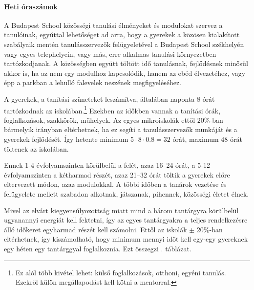 \paragraph{Heti óraszámok}

A Budapest School közösségi tanulási élményeket és modulokat szervez a
tanulóinak, egyúttal lehetőséget ad arra, hogy a gyerekek a közösen kialakított
szabályaik mentén tanulásszervezők felügyeletével a Budapest School székhelyén
vagy egyes telephelyein, vagy más, erre alkalmas tanulási környezetben
tartózkodjanak. A közösségben együtt töltött idő tanulásnak, fejlődésnek
minősül akkor is, ha az nem egy modulhoz kapcsolódik, hanem az ebéd
élvezetéhez, vagy épp a parkban a lehulló falevelek neszének megfigyeléséhez.

A gyerekek, a tanítási szüneteket leszámítva, általában naponta 8 órát
tartózkodnak az
iskolában.\footnote{Ez alól több kivétel lehet: külső foglalkozások, otthoni,
  egyéni tanulás. Ezekről külön megállapodást kell kötni a mentorral.} Ezekben
az
időkben vannak a tanítási órák, foglalkozások, szakkörök,
műhelyek. Az egyes mikroiskolák ettől 20\%-ban bármelyik irányban eltérhetnek,
ha ez segíti a tanulásszervezők munkáját és a gyerekek fejlődését. Így hetente
minimum $5 \cdot 8 \cdot 0.8 = 32$ órát, maximum 48 órát töltenek az iskolában.

Ennek 1-4 évfolyamszinten körülbelül a felét, azaz 16--24 órát, a 5-12
évfolyamszinten a  kétharmad részét, azaz 21--32 órát
töltik a gyerekek előre eltervezett módon, azaz modulokkal. A többi időben a tanárok
vezetése és felügyelete mellett szabadon alkotnak, játszanak, pihennek,
közösségi életet élnek.

Mivel az elvárt kiegyensúlyozottság miatt mind a három tantárgyra körülbelül
ugyanannyi energiát kell fektetni, így az egyes tantárgyakra a teljes
rendelkezésre álló időkeret egyharmad részét kell számolni. Ettől az iskolák
$\pm$ 20\%-ban eltérhetnek, így kiszámolható, hogy minimum mennyi időt kell
egy-egy gyereknek egy héten egy tantárggyal foglalkoznia. Ezt összegzi
. táblázat.

